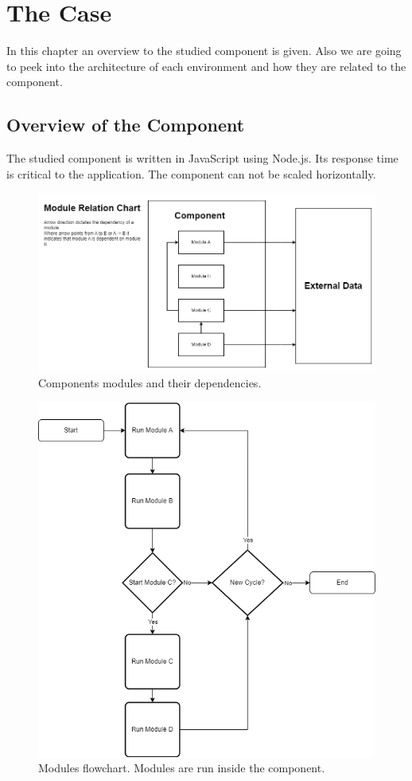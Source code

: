 \chapter{The Case\label{case}}

In this chapter an overview to the studied component is given.
Also we are going to peek into the architecture of each environment and how they are related to the component.

\section{Overview of the Component}
The studied component is written in JavaScript using Node.js.
Its response time is critical to the application.
The component can not be scaled horizontally.

\begin{figure}
    \includegraphics[width=\textwidth]{images/modules_relation_uml.png}
    \caption{Components modules and their dependencies.}
    \label{figure:module:relation}
\end{figure}
\begin{figure}
    \includegraphics[width=\textwidth]{images/module_flow_chart.png}
    \caption{Modules flowchart. Modules are run inside the component.}
    \label{figure:module:flow}
\end{figure}

